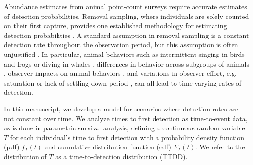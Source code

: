 \documentclass[12pt]{article}
\begin{document}
Abundance estimates from animal point-count surveys require accurate estimates of detection probabilities.  
Removal sampling, where individuals are solely counted on their first capture, provides one established methodology for estimating detection probabilities \citep{Farnsworth2002}.
A standard assumption in removal sampling is a constant detection rate throughout the observation period, but this assumption is often unjustified \citep{Alldredge2007, LeeMarsden2008}.  
In particular, animal behaviors such as intermittent singing in birds and frogs or diving in whales \citep{Scott2005, Diefenbach2007, Reidy2011}, differences in behavior across subgroups of animals \citep{Otis1978, Farnsworth2002}, observer impacts on animal behaviors \citep{McSheaRappole1997, Rosenstock2002, Alldredge2007}, and variations in observer effort, e.g. saturation or lack of settling down period \citep{Petit1995, LeeMarsden2008, Johnson2008}, can all lead to time-varying rates of detection.

In this manuscript, we develop a model for scenarios where detection rates are not constant over time. 
We analyze times to first detection as time-to-event data, as is done in parametric survival analysis, defining a continuous random variable $T$ for each individual's time to first detection with a probability density function (pdf) $f_T(t)$ and cumulative distribution function (cdf) $F_T(t)$.  
We refer to the distribution of $T$ as a time-to-detection distribution (TTDD).
\end{document}
